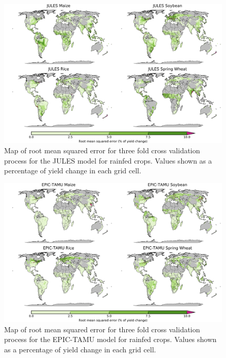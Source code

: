 \documentclass[12pt]{article}
\begin{document}
\begin{figure}[h!]
  \centering
  \includegraphics[width=15.5cm]{JULES_spatial_MSE_ton_ha.png}
  \caption{Map of root mean squared error for three fold cross validation process for the JULES model for rainfed crops. Values shown as a percentage of yield change in each grid cell.}
\end{figure}

\begin{figure}[h!]
  \centering
  \includegraphics[width=15.5cm]{EPIC-TAMU_spatial_MSE_ton_ha.png}
  \caption{Map of root mean squared error for three fold cross validation process for the EPIC-TAMU model for rainfed crops. Values shown as a percentage of yield change in each grid cell.}
\end{figure}
\end{document}
